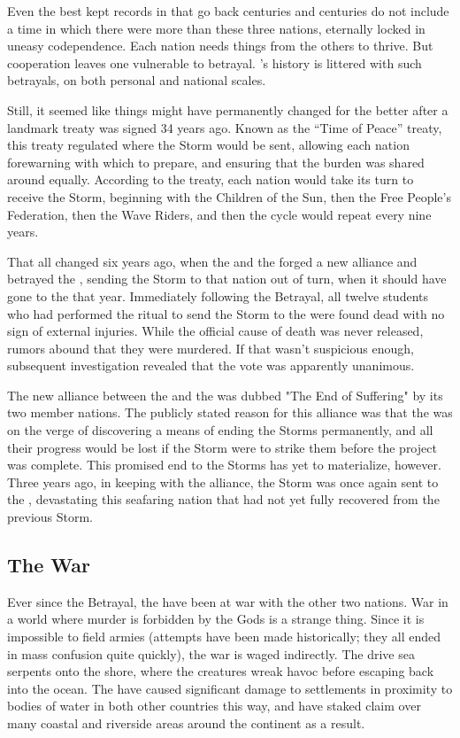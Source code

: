 \documentclass[blue]{GL2020}
\begin{document}
Even the best kept records in \pEarth{} that go back centuries and centuries do not include a time in which there were more than these three nations, eternally locked in uneasy codependence. Each nation needs things from the others to thrive. But cooperation leaves one vulnerable to betrayal. \pEarth{}'s history is littered with such betrayals, on both personal and national scales.

Still, it seemed like things might have permanently changed for the better after a landmark treaty was signed 34 years ago. Known as the “Time of Peace” treaty, this treaty regulated where the Storm would be sent, allowing each nation forewarning with which to prepare, and ensuring that the burden was shared around equally. According to the treaty, each nation would take its turn to receive the Storm, beginning with the Children of the Sun, then the Free People’s Federation, then the Wave Riders, and then the cycle would repeat every nine years. 

That all changed six years ago, when the \pFarm{} and the \pTech{} forged a new alliance and betrayed the \pShippies{}, sending the Storm to that nation out of turn, when it should have gone to the \pTech{} that year. Immediately following the Betrayal, all twelve students who had performed the ritual to send the Storm to the \pShippies{} were found dead with no sign of external injuries. While the official cause of death was never released, rumors abound that they were murdered. If that wasn't suspicious enough, subsequent investigation revealed that the vote was apparently unanimous. 

The new alliance between the \pFarm{} and the \pTech{} was dubbed "The End of Suffering" by its two member nations. The publicly stated reason for this alliance was that the \pTech{} was on the verge of discovering a means of ending the Storms permanently, and all their progress would be lost if the Storm were to strike them before the project was complete. This promised end to the Storms has yet to materialize, however. Three years ago, in keeping with the alliance, the Storm was once again sent to the \pShippies{}, devastating this seafaring nation that had not yet fully recovered from the previous Storm.

\subsection*{The War}
Ever since the Betrayal, the \pShippies{} have been at war with the other two nations. War in a world where murder is forbidden by the Gods is a strange thing. Since it is impossible to field armies (attempts have been made historically; they all ended in mass confusion quite quickly), the war is waged indirectly. The \pShippies{} drive sea serpents onto the shore, where the creatures wreak havoc before escaping back into the ocean. The \pShippies{} have caused significant damage to settlements in proximity to bodies of water in both other countries this way, and have staked claim over many coastal and riverside areas around the continent as a result.
\end{document}
